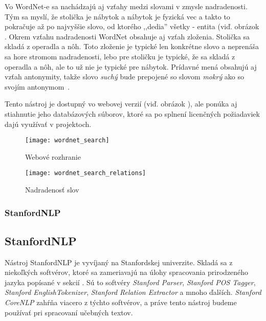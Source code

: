 Vo WordNet-e sa nachádzajú aj vzťahy medzi slovami v zmysle nadradenosti. Tým sa myslí, že stolička je nábytok a nábytok je fyzická vec a takto to pokračuje až po najvyššie slovo, od ktorého ,,dedia'' všetky - entita (viď. obrázok . Okrem vzťahu nadradenosti WordNet obsahuje aj vzťah zloženia. Stolička sa skladá z operadla a nôh. Toto zloženie je typické len konkrétne slovo a neprenáša sa hore stromom nadradenosti,   lebo pre stoličku je typické, že sa skladá z operadla a nôh, ale to už nie je typické pre nábytok.
Prídavné mená obsahujú aj vzťah antonymity, takže slovo \textit{suchý} bude prepojené so slovom \textit{mokrý} ako so svojím antonymom~\cite{WordNetPage}.

Tento nástroj je dostupný vo webovej verzií (viď. obrázok ), ale ponúka aj stiahnutie jeho databázových súborov, ktoré sa po splnení licenčných požiadaviek dajú využívať v projektoch.

\begin{figure}[H]
\begin{center}\texttt{[image: wordnet\_search]}\end{center}
\caption[Webové rozhranie]{Webové rozhranie}\label{fig:wordnet_search}
\end{figure}

\begin{figure}[H]
\begin{center}\texttt{[image: wordnet\_search\_relations]}\end{center}
\caption[Nadradenosť slov]{Nadradenosť slov}\label{fig:wordnet_relations}
\end{figure}

%
%
{
	\subsubsection{StanfordNLP}
}
{
	\subsection{StanfordNLP}
}
\label{subsubsec:stanfordnlp}
Nástroj StanfordNLP je vyvíjaný na Stanfordskej univerzite. Skladá sa z niekoľkých softvérov, ktoré sa zameriavajú na úlohy spracovania prirodzeného jazyka popísané v sekcií . Sú to softvéry \textit{Stanford Parser}, \textit{Stanford POS Tagger}, \textit{Stanford EnglishTokenizer}, \textit{Stanford Relation Extractor} a mnoho ďalších. \textit{Stanford CoreNLP} zahŕňa viacero z týchto softvérov, a práve tento nástroj budeme používať pri spracovaní učebných textov.

